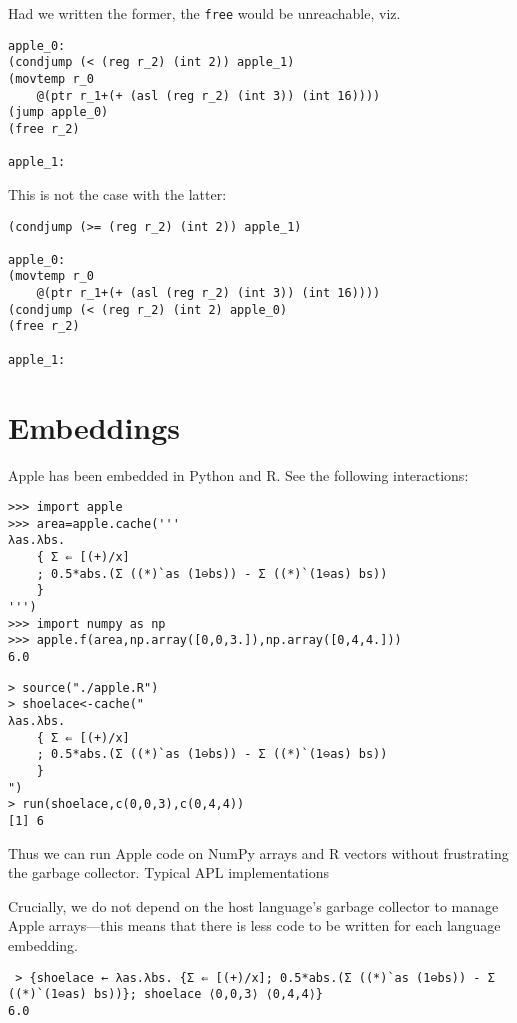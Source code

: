 \documentclass[sigplan,screen]{acmart}
\begin{document}
Had we written the former, the {\tt free} would be unreachable, viz.

\begin{verbatim}
apple_0:
(condjump (< (reg r_2) (int 2)) apple_1)
(movtemp r_0
    @(ptr r_1+(+ (asl (reg r_2) (int 3)) (int 16))))
(jump apple_0)
(free r_2)

apple_1:
\end{verbatim}

This is not the case with the latter:

\begin{verbatim}
(condjump (>= (reg r_2) (int 2)) apple_1)

apple_0:
(movtemp r_0
    @(ptr r_1+(+ (asl (reg r_2) (int 3)) (int 16))))
(condjump (< (reg r_2) (int 2) apple_0)
(free r_2)

apple_1:
\end{verbatim}

\section{Embeddings}

Apple has been embedded in Python and R. See the following interactions:

\begin{verbatim}
>>> import apple
>>> area=apple.cache('''
λas.λbs.
    { Σ ⇐ [(+)/x]
    ; 0.5*abs.(Σ ((*)`as (1⊖bs)) - Σ ((*)`(1⊖as) bs))
    }
''')
>>> import numpy as np
>>> apple.f(area,np.array([0,0,3.]),np.array([0,4,4.]))
6.0
\end{verbatim}

\begin{verbatim}
> source("./apple.R")
> shoelace<-cache("
λas.λbs.
    { Σ ⇐ [(+)/x]
    ; 0.5*abs.(Σ ((*)`as (1⊖bs)) - Σ ((*)`(1⊖as) bs))
    }
")
> run(shoelace,c(0,0,3),c(0,4,4))
[1] 6
\end{verbatim}

Thus we can run Apple code on NumPy arrays and R vectors without frustrating the garbage collector. Typical APL implementations

Crucially, we do not depend on the host language's garbage collector to manage Apple arrays---this means that there is less code to be written for each language embedding.

\begin{verbatim}
 > {shoelace ← λas.λbs. {Σ ⇐ [(+)/x]; 0.5*abs.(Σ ((*)`as (1⊖bs)) - Σ ((*)`(1⊖as) bs))}; shoelace ⟨0,0,3⟩ ⟨0,4,4⟩}
6.0
\end{verbatim}
\end{document}
